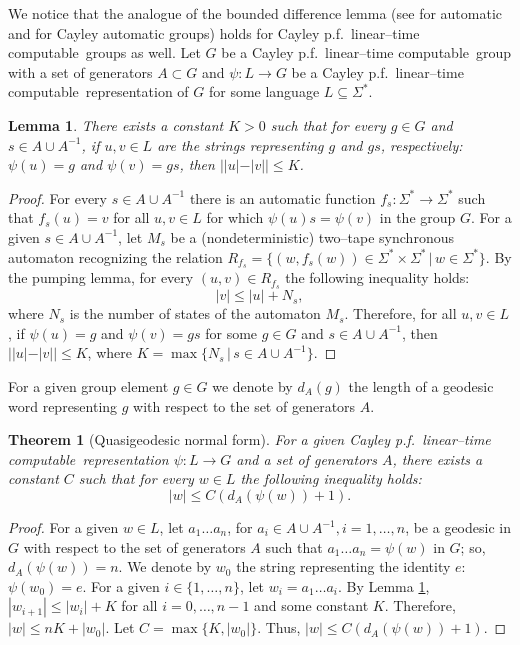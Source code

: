 \documentclass[article,12pt]{elsarticle}
\newtheorem{theorem}{Theorem}
\newtheorem{lemma}{Lemma}
\newcommand\linearC{Cayley p.f.~linear--time computable}
\begin{document}
We notice that the analogue of the bounded  
difference lemma 
(see \cite[Lemma~2.3.9]{Epsteinbook} for automatic 
and \cite[Lemma~8.1]{KKM11} for Cayley automatic 
groups) holds for \linearC\ 
groups as well.
Let $G$ be a \linearC\ group with a set of 
generators $A \subset G$ and $\psi : L \rightarrow G$ 
be a \linearC\ representation of $G$
for some language $L \subseteq \Sigma^*$. 
\begin{lemma} 
	\label{bounded_difference_lemma}
	There exists a constant $K>0$ such that  
	for every $g \in G$ and $s \in A \cup A^{-1}$, 
	if $u,v \in L$ are the strings representing 
	$g$ and $gs$, respectively: $\psi(u)=g $ 
	and $\psi(v)=gs$, then  
	$||u|-|v|| \leqslant K$.
\end{lemma} 	
\begin{proof} 
	For every $s \in A \cup A^{-1}$ there is 
	an automatic function  
	$f_s : \Sigma^* \rightarrow \Sigma^*$ 
	such that $f_s (u) = v$ for all  
	$u,v \in L$  for which 
	$\psi (u)s = \psi (v)$ in the group $G$. 
	For a given $s \in A \cup A^{-1}$,   
	let $M_s$ be a (nondeterministic) two--tape 
	synchronous automaton recognizing the 
	relation 
	$R_{f_s} = \{(w, f_s(w)) \in \Sigma^* \times \Sigma^* 
	\, | \,  w \in \Sigma^*\}$. 
	By the pumping lemma, for every 
	$(u,v) \in R_{f_s}$ the following 
	inequality holds:  
	$$
	|v| \leqslant |u| + N_s,   
	$$
	where $N_s$ is the number of states 
	of the automaton $M_s$. 
	Therefore, 
	for all $u,v \in L$, if 
	$\psi(u)=g$ and $\psi(v)=gs$ 
	for some $g \in G$ and $s \in A \cup A^{-1}$,
	then $||u|-|v|| \leqslant K$, 
	where $K = \max \{ N_s \, | \, s \in A \cup A^{-1}\}$.
\end{proof}	
For a given group element $g \in G$ we denote by 
$d_A (g)$ the length of a geodesic word representing 
$g$ with respect to the set of generators $A$. 
\begin{theorem}[Quasigeodesic normal form]  
	\label{quasigeodesicnormalformthm}   
	For a given \linearC\ representation 
	$\psi : L \rightarrow G$ and a set of generators 
	$A$, there exists a constant $C$ such that for every 
	$w \in L$ the following inequality holds: 
	\begin{equation} 
	\label{qgeodnormformineq}   
	|w| \leqslant C ( d_A (\psi(w)) + 1).     
	\end{equation}  	 
\end{theorem}
\begin{proof} 
	For a given $w \in L$, let $a_1  \dots  a_n$,
	for $a_i \in A \cup A^{-1}, i=1,\dots,n$,
	be a geodesic in $G$ with 
	respect to the set of generators $A$ such that 
	$a_1 \dots a_n = \psi(w)$ in $G$; so, $d_A(\psi (w)) =n$.  
	We denote by $w_0$ the string representing  
	the identity $e$: $\psi(w_0) = e$. For a
	given $i \in \{1,\dots,n\}$, let  
	$w_i = a_1 \dots a_i$.     
	By Lemma \ref{bounded_difference_lemma}, 
	$|w_{i+1}| \leqslant |w_i| + K$ for all 
	$i=0,\dots,n-1$ and some constant $K$. 
	Therefore, $|w| \leqslant n K + |w_0|$.
	Let $C = \max \{K, |w_0|\}$. Thus, 
	$|w| \leqslant C (d_A (\psi(w)) + 1)$. 
\end{proof}
\end{document}
